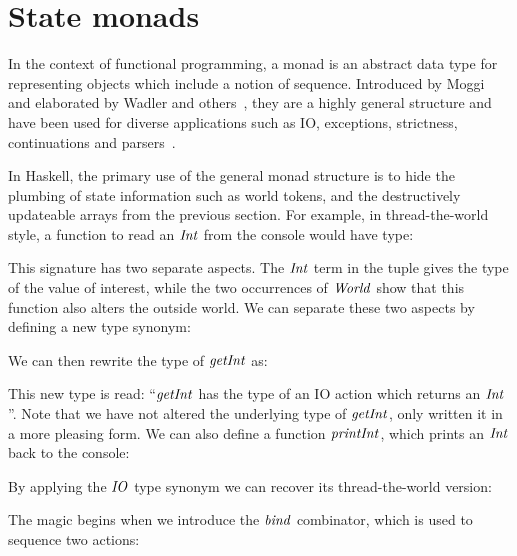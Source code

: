 \section{State monads}
\label{intro:monads}

In the context of functional programming, a monad is an abstract data type for representing objects which include a notion of sequence. Introduced by Moggi~\cite{moggi:monads} and elaborated by Wadler and others~\cite{wadler:comprehending-monads, peyton-jones:ifp, launchbury:lazy-imperative, liang:monad-transformers}, they are a highly general structure and have been used for diverse applications such as IO, exceptions, strictness, continuations and parsers~\cite{leigen:parsec, hutton:monadic-parsing}.

In Haskell, the primary use of the general monad structure is to hide the plumbing of state information such as world tokens, and the destructively updateable arrays from the previous section. For example, in thread-the-world style, a function to read an $\operatorname{\mathit{Int}}$ from the console would have type:

\code{
	$\igetInt :: \iWorld \to (\iInt, \iWorld)$
}

This signature has two separate aspects. The $\operatorname{\mathit{Int}}$ term in the tuple gives the type of the value of interest, while the two occurrences of $\operatorname{\mathit{World}}$ show that this function also alters the outside world. We can separate these two aspects by defining a new type synonym:


We can then rewrite the type of $\operatorname{\mathit{getInt}}$ as:

\code{
	$\igetInt :: \iIO \ \iInt$
}

This new type is read: ``$\operatorname{\mathit{getInt}}$ has the type of an IO action which returns an $\operatorname{\mathit{Int}}$''. Note that we have not altered the underlying type of $\operatorname{\mathit{getInt}}$, only written it in a more pleasing form. We can also define a function $\operatorname{\mathit{printInt}}$, which prints an $\operatorname{\mathit{Int}}$ back to the console:

\code{
	$\iprintInt :: \iInt \to \iIO \ ()$
}

By applying the $\operatorname{\mathit{IO}}$ type synonym we can recover its thread-the-world version:

\code{
	$\iprintInt :: \iInt \to \iWorld \to ((), \ \iWorld)$
}

The magic begins when we introduce the $\operatorname{\mathit{bind}}$ combinator, which is used to sequence two actions:


